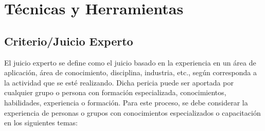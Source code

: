 \documentclass[letterpaper,12pt,openright,oneside]{article}
\theoremstyle{plain}
\begin{document}
%  
%  
\section*{Técnicas y Herramientas}

% 
%
\subsection*{Criterio/Juicio Experto}

El juicio experto se define como el juicio basado en la experiencia en un área de aplicación, área de conocimiento, disciplina, industria, etc., según corresponda a la actividad que se esté realizando. Dicha pericia puede ser aportada por cualquier grupo o persona con formación especializada, conocimientos, habilidades, experiencia o formación.
Para este proceso, se debe considerar la experiencia de personas o grupos con conocimientos especializados o capacitación en los siguientes temas:
\end{document}
